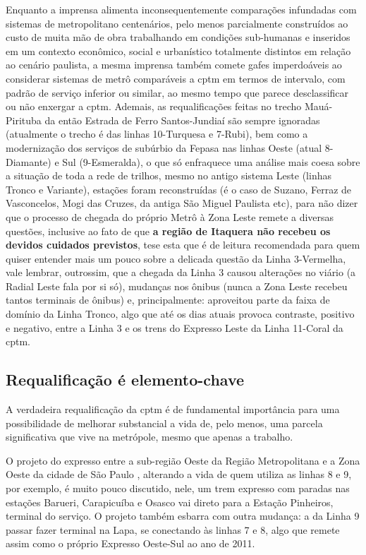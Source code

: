 \documentclass[11pt,fleqn]{book} %
\begin{document}
Enquanto a imprensa alimenta inconsequentemente comparações infundadas com sistemas de metropolitano centenários, pelo menos parcialmente construídos ao custo de muita mão de obra trabalhando em condições sub-humanas e inseridos em um contexto econômico, social e urbanístico totalmente distintos em relação ao cenário paulista, a mesma imprensa também comete gafes imperdoáveis ao considerar sistemas de metrô comparáveis a \gls{cptm} em termos de intervalo, com padrão de serviço inferior ou similar, ao mesmo tempo que parece desclassificar ou não enxergar a \gls{cptm}. Ademais, as requalificações feitas no trecho Mauá-Pirituba da então Estrada de Ferro Santos-Jundiaí são sempre ignoradas (atualmente o trecho é das linhas 10-Turquesa e 7-Rubi), bem como a modernização dos serviços de subúrbio da Fepasa nas linhas Oeste (atual 8-Diamante) e Sul (9-Esmeralda), o que só enfraquece uma análise mais coesa sobre a situação de toda a rede de trilhos, mesmo no antigo sistema Leste (linhas Tronco e Variante), estações foram reconstruídas (é o caso de Suzano, Ferraz de Vasconcelos, Mogi das Cruzes, da antiga São Miguel Paulista etc), para não dizer que o processo de chegada do próprio Metrô à Zona Leste remete a diversas questões, inclusive ao fato de que \textbf{a região de Itaquera não recebeu os devidos cuidados previstos}, tese esta \cite{ramalhoso2013a} que é de leitura recomendada para quem quiser entender mais um pouco sobre a delicada questão da Linha 3-Vermelha, vale lembrar, outrossim, que a chegada da Linha 3 causou alterações no viário (a Radial Leste fala por si só), mudanças nos ônibus (nunca a Zona Leste recebeu tantos terminais de ônibus) e, principalmente: aproveitou parte da faixa de domínio da Linha Tronco, algo que até os dias atuais provoca contraste, positivo e negativo, entre a Linha 3 e os trens do Expresso Leste da Linha 11-Coral da \gls{cptm}.

\subsection{Requalificação é elemento-chave}

A verdadeira requalificação da \gls{cptm} é de fundamental importância para uma possibilidade de melhorar substancial a vida de, pelo menos, uma parcela significativa que vive na metrópole, mesmo que apenas a trabalho.

O projeto do expresso entre a sub-região Oeste da Região Metropolitana e a Zona Oeste da cidade de São Paulo \cites{alesp2011a}{izidoro2011a}, alterando a vida de quem utiliza as linhas 8 e 9, por exemplo, é muito pouco discutido, nele, um trem expresso com paradas nas estações Barueri, Carapicuíba e Osasco vai direto para a Estação Pinheiros, terminal do serviço. O projeto também esbarra com outra mudança: a da Linha 9 passar fazer terminal na Lapa, se conectando às linhas 7 e 8, algo que remete assim como o próprio Expresso Oeste-Sul ao ano de 2011.
\end{document}
